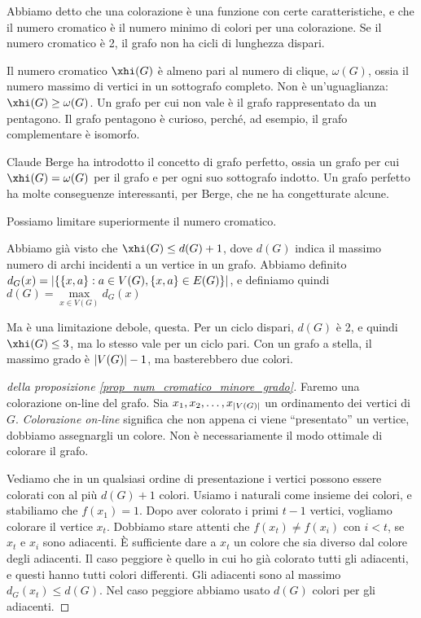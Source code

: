 Abbiamo detto che una colorazione \`e una funzione con certe caratteristiche, e che il numero cromatico \`e il numero minimo di colori per una colorazione.
Se il numero cromatico \`e 2, il grafo non ha cicli di lunghezza dispari.

Il numero cromatico $\xhi(G)$ \`e almeno pari al numero di clique, $\omega(G)$, ossia il numero massimo di vertici in un sottografo completo.
Non \`e un'uguaglianza: $\xhi(G) \ge \omega(G)$.
Un grafo per cui non vale \`e il grafo rappresentato da un pentagono.
Il grafo pentagono \`e curioso, perch\'e, ad esempio, il grafo complementare \`e isomorfo.


Claude Berge ha introdotto il concetto di grafo perfetto, ossia un grafo per cui $\xhi(G) = \omega(G)$ per il grafo e per ogni suo sottografo indotto.
Un grafo perfetto ha molte conseguenze interessanti, per Berge, che ne ha congetturate alcune.

Possiamo limitare superiormente il numero cromatico.
\begin{prop}
	\label{prop_num_cromatico_minore_grado}
	Abbiamo gi\`a visto che $\xhi(G) \le d(G) + 1$, dove $d(G)$ indica il massimo numero di archi incidenti a un vertice in un grafo.
	Abbiamo definito $d_G(x) = \left\lvert{\{ \{x,a\} : a \in V(G), \{x,a\} \in E(G) \}}\right\rvert$, e definiamo quindi $d(G) = \max\limits_{x \in V(G)} d_G(x)$
\end{prop}
Ma \`e una limitazione debole, questa.
Per un ciclo dispari, $d(G)$ \`e 2, e quindi $\xhi(G) \le 3$, ma lo stesso vale per un ciclo pari.
Con un grafo a stella, il massimo grado \`e $\left\lvert{V(G)}\right\rvert - 1$, ma basterebbero due colori.

\begin{proof}[della proposizione \ref{prop_num_cromatico_minore_grado}]
	Faremo una colorazione on-line del grafo.
	Sia $x_1, x_2, \dots, x_{\left\lvert{V(G)}\right\rvert}$ un ordinamento dei vertici di $G$.
	\emph{Colorazione on-line} significa che non appena ci viene ``presentato'' un vertice, dobbiamo assegnargli un colore.
	Non \`e necessariamente il modo ottimale di colorare il grafo.

	Vediamo che in un qualsiasi ordine di presentazione i vertici possono essere colorati con al pi\`u $d(G) + 1$ colori.
	Usiamo i naturali come insieme dei colori, e stabiliamo che $f(x_1) = 1$.
	Dopo aver colorato i primi $t-1$ vertici, vogliamo colorare il vertice $x_t$.
	Dobbiamo stare attenti che $f(x_t) \neq f(x_i)$ con $i < t$, se $x_t$ e $x_i$ sono adiacenti.
	\`E sufficiente dare a $x_t$ un colore che sia diverso dal colore degli adiacenti.
	Il caso peggiore \`e quello in cui ho gi\`a colorato tutti gli adiacenti, e questi hanno tutti colori differenti.
	Gli adiacenti sono al massimo $d_G(x_t) \le d(G)$.
	Nel caso peggiore abbiamo usato $d(G)$ colori per gli adiacenti.
\end{proof}

